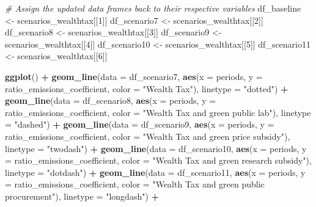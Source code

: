 \documentclass[
]{article}
\newenvironment{Shaded}{\begin{snugshade}}{\end{snugshade}}
\newcommand{\AttributeTok}[1]{\textcolor[rgb]{0.13,0.29,0.53}{#1}}
\newcommand{\CommentTok}[1]{\textcolor[rgb]{0.56,0.35,0.01}{\textit{#1}}}
\newcommand{\DecValTok}[1]{\textcolor[rgb]{0.00,0.00,0.81}{#1}}
\newcommand{\FunctionTok}[1]{\textcolor[rgb]{0.13,0.29,0.53}{\textbf{#1}}}
\newcommand{\NormalTok}[1]{#1}
\newcommand{\OtherTok}[1]{\textcolor[rgb]{0.56,0.35,0.01}{#1}}
\newcommand{\SpecialCharTok}[1]{\textcolor[rgb]{0.81,0.36,0.00}{\textbf{#1}}}
\newcommand{\StringTok}[1]{\textcolor[rgb]{0.31,0.60,0.02}{#1}}
\begin{document}
\begin{Shaded}
\begin{Highlighting}[]
\CommentTok{\# Assign the updated data frames back to their respective variables}
\NormalTok{df\_baseline }\OtherTok{\textless{}{-}}\NormalTok{ scenarios\_wealthtax[[}\DecValTok{1}\NormalTok{]]}
\NormalTok{df\_scenario7 }\OtherTok{\textless{}{-}}\NormalTok{ scenarios\_wealthtax[[}\DecValTok{2}\NormalTok{]]}
\NormalTok{df\_scenario8 }\OtherTok{\textless{}{-}}\NormalTok{ scenarios\_wealthtax[[}\DecValTok{3}\NormalTok{]]}
\NormalTok{df\_scenario9 }\OtherTok{\textless{}{-}}\NormalTok{ scenarios\_wealthtax[[}\DecValTok{4}\NormalTok{]]}
\NormalTok{df\_scenario10 }\OtherTok{\textless{}{-}}\NormalTok{ scenarios\_wealthtax[[}\DecValTok{5}\NormalTok{]]}
\NormalTok{df\_scenario11 }\OtherTok{\textless{}{-}}\NormalTok{ scenarios\_wealthtax[[}\DecValTok{6}\NormalTok{]]}


\FunctionTok{ggplot}\NormalTok{() }\SpecialCharTok{+}
  \FunctionTok{geom\_line}\NormalTok{(}\AttributeTok{data =}\NormalTok{ df\_scenario7, }\FunctionTok{aes}\NormalTok{(}\AttributeTok{x =}\NormalTok{ periods, }\AttributeTok{y =}\NormalTok{ ratio\_emissions\_coefficient, }\AttributeTok{color =} \StringTok{"Wealth Tax"}\NormalTok{), }\AttributeTok{linetype =} \StringTok{"dotted"}\NormalTok{) }\SpecialCharTok{+}
  \FunctionTok{geom\_line}\NormalTok{(}\AttributeTok{data =}\NormalTok{ df\_scenario8, }\FunctionTok{aes}\NormalTok{(}\AttributeTok{x =}\NormalTok{ periods, }\AttributeTok{y =}\NormalTok{ ratio\_emissions\_coefficient, }\AttributeTok{color =} \StringTok{"Wealth Tax and green public lab"}\NormalTok{), }\AttributeTok{linetype =} \StringTok{"dashed"}\NormalTok{) }\SpecialCharTok{+}
  \FunctionTok{geom\_line}\NormalTok{(}\AttributeTok{data =}\NormalTok{ df\_scenario9, }\FunctionTok{aes}\NormalTok{(}\AttributeTok{x =}\NormalTok{ periods, }\AttributeTok{y =}\NormalTok{ ratio\_emissions\_coefficient, }\AttributeTok{color =} \StringTok{"Wealth Tax and green price subsidy"}\NormalTok{), }\AttributeTok{linetype =} \StringTok{"twodash"}\NormalTok{) }\SpecialCharTok{+}
  \FunctionTok{geom\_line}\NormalTok{(}\AttributeTok{data =}\NormalTok{ df\_scenario10, }\FunctionTok{aes}\NormalTok{(}\AttributeTok{x =}\NormalTok{ periods, }\AttributeTok{y =}\NormalTok{ ratio\_emissions\_coefficient, }\AttributeTok{color =} \StringTok{"Wealth Tax and green research subsidy"}\NormalTok{), }\AttributeTok{linetype =} \StringTok{"dotdash"}\NormalTok{) }\SpecialCharTok{+}
  \FunctionTok{geom\_line}\NormalTok{(}\AttributeTok{data =}\NormalTok{ df\_scenario11, }\FunctionTok{aes}\NormalTok{(}\AttributeTok{x =}\NormalTok{ periods, }\AttributeTok{y =}\NormalTok{ ratio\_emissions\_coefficient, }\AttributeTok{color =} \StringTok{"Wealth Tax and green public procurement"}\NormalTok{), }\AttributeTok{linetype =} \StringTok{"longdash"}\NormalTok{) }\SpecialCharTok{+}

\end{Highlighting}
\end{Shaded}
\end{document}

